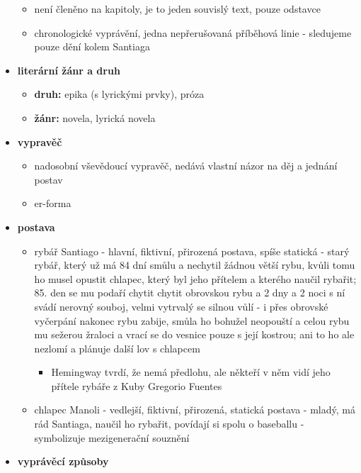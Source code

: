 \documentclass[11pt]{article}
\begin{document}
\begin{itemize}
\begin{itemize}
            \item není členěno na kapitoly, je to jeden souvislý text, pouze odstavce
            \item chronologické vyprávění, jedna nepřerušovaná příběhová linie - sledujeme pouze dění kolem Santiaga
        \end{itemize}
        \item\textbf{literární žánr a druh}
        \begin{itemize}
            \item\textbf{druh: }epika (s lyrickými prvky), próza
            \item\textbf{žánr: }novela, lyrická novela
        \end{itemize}
        \item\textbf{vypravěč}
        \begin{itemize}
            \item nadosobní vševědoucí vypravěč, nedává vlastní názor na děj a jednání postav
            \item er-forma
        \end{itemize}
        \item\textbf{postava}
        \begin{itemize}
            \item rybář Santiago - hlavní, fiktivní, přirozená postava, spíše statická - starý rybář, který už má 84 dní smůlu a nechytil žádnou větší rybu, kvůli tomu ho musel opustit chlapec, který byl jeho přítelem a kterého naučil rybařit; 85. den se mu podaří chytit chytit obrovskou rybu a 2 dny a 2 noci s ní svádí nerovný souboj, velmi vytrvalý se silnou vůlí - i přes obrovské vyčerpání nakonec rybu zabije, smůla ho bohužel neopouští a celou rybu mu sežerou žraloci a vrací se do vesnice pouze s její kostrou; ani to ho ale nezlomí a plánuje další lov s chlapcem
                \begin{itemize}
                    \item Hemingway tvrdí, že nemá předlohu, ale někteří v něm vidí jeho přítele rybáře z Kuby Gregorio Fuentes
                \end{itemize}
            \item chlapec Manoli - vedlejší, fiktivní, přirozená, statická postava - mladý, má rád Santiaga, naučil ho rybařit, povídají si spolu o baseballu - symbolizuje mezigenerační souznění
        \end{itemize}
        \item\textbf{vyprávěcí způsoby}
        \begin{itemize}

\end{itemize}
\end{itemize}
\end{document}
